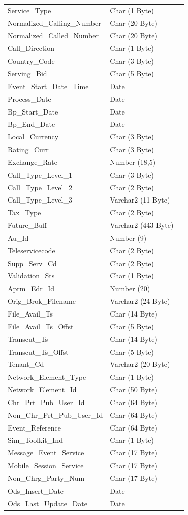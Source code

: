 \documentclass[12pt,twoside]{article}
\begin{document}
\begin{longtable}{l|l|l}
Service\_Type & Char (1 Byte) & \\
Normalized\_Calling\_Number & Char (20 Byte) & \\
Normalized\_Called\_Number & Char (20 Byte) & \\
Call\_Direction & Char (1 Byte) & \\
Country\_Code & Char (3 Byte) & \\
Serving\_Bid & Char (5 Byte) & \\
Event\_Start\_Date\_Time & Date & \\
Process\_Date & Date & \\
Bp\_Start\_Date & Date & \\
Bp\_End\_Date & Date & \\
Local\_Currency & Char (3 Byte) & \\
Rating\_Curr & Char (3 Byte) & \\
Exchange\_Rate & Number (18,5) & \\
Call\_Type\_Level\_1 & Char (3 Byte) & \\
Call\_Type\_Level\_2 & Char (2 Byte) & \\
Call\_Type\_Level\_3 & Varchar2 (11 Byte) & \\
Tax\_Type & Char (2 Byte) & \\
Future\_Buff & Varchar2 (443 Byte) & \\
Au\_Id & Number (9) & \\
Teleservicecode & Char (2 Byte) & \\
Supp\_Serv\_Cd & Char (2 Byte) & \\
Validation\_Sts & Char (1 Byte) & \\
Aprm\_Edr\_Id & Number (20) & \\
Orig\_Brok\_Filename & Varchar2 (24 Byte) & \\
File\_Avail\_Ts & Char (14 Byte) & \\
File\_Avail\_Ts\_Offst & Char (5 Byte) & \\
Transcut\_Ts & Char (14 Byte) & \\
Transcut\_Ts\_Offst & Char (5 Byte) & \\
Tenant\_Cd & Varchar2 (20 Byte) & \\
Network\_Element\_Type & Char (1 Byte) & \\
Network\_Element\_Id & Char (50 Byte) & \\
Chr\_Prt\_Pub\_User\_Id & Char (64 Byte) & \\
Non\_Chr\_Prt\_Pub\_User\_Id & Char (64 Byte) & \\
Event\_Reference & Char (64 Byte) & \\
Sim\_Toolkit\_Ind & Char (1 Byte) & \\
Message\_Event\_Service & Char (17 Byte) & \\
Mobile\_Session\_Service & Char (17 Byte) & \\
Non\_Chrg\_Party\_Num & Char (17 Byte) & \\
Ods\_Insert\_Date & Date & \\
Ods\_Last\_Update\_Date & Date & \\
\hline
\end{longtable}
\end{document}
